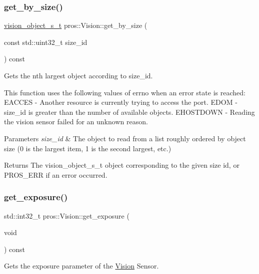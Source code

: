 \subsubsection{\texorpdfstring{get\_by\_size()}{get\_by\_size()}}
{\footnotesize\ttfamily \mbox{\hyperlink{vision_8h_ae619120558539c13e53b5a6f42fb4375}{vision\+\_\+object\+\_\+s\+\_\+t}} pros\+::\+Vision\+::get\+\_\+by\+\_\+size (\begin{DoxyParamCaption}\item[{const std\+::uint32\+\_\+t}]{size\+\_\+id }\end{DoxyParamCaption}) const}



Gets the nth largest object according to size\+\_\+id. 

This function uses the following values of errno when an error state is reached\+: E\+A\+C\+C\+ES -\/ Another resource is currently trying to access the port. E\+D\+OM -\/ size\+\_\+id is greater than the number of available objects. E\+H\+O\+S\+T\+D\+O\+WN -\/ Reading the vision sensor failed for an unknown reason.


\begin{DoxyParams}{Parameters}
{\em size\+\_\+id} & The object to read from a list roughly ordered by object size (0 is the largest item, 1 is the second largest, etc.)\\
\hline
\end{DoxyParams}
\begin{DoxyReturn}{Returns}
The vision\+\_\+object\+\_\+s\+\_\+t object corresponding to the given size id, or P\+R\+O\+S\+\_\+\+E\+RR if an error occurred. 
\end{DoxyReturn}
\mbox{\label{classpros_1_1Vision_a80552b2897b8edcdb68bc56477213f2e}} 
\subsubsection{\texorpdfstring{get\_exposure()}{get\_exposure()}}
{\footnotesize\ttfamily std\+::int32\+\_\+t pros\+::\+Vision\+::get\+\_\+exposure (\begin{DoxyParamCaption}\item[{void}]{ }\end{DoxyParamCaption}) const}



Gets the exposure parameter of the \mbox{\hyperlink{classpros_1_1Vision}{Vision}} Sensor. 

